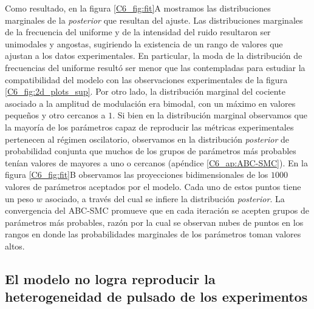 \documentclass[./main.tex]{subfiles}
\begin{document}
Como resultado, en la figura \ref{C6_fig:fit}A mostramos las distribuciones marginales de la \textit{posterior} que resultan del ajuste. Las distribuciones marginales de la frecuencia del uniforme y de la intensidad del ruido resultaron ser unimodales y angostas, sugiriendo la existencia de un rango de valores que ajustan a los datos experimentales. En particular, la moda de la distribución de frecuencias del uniforme resultó ser menor que las contempladas para estudiar la compatibilidad del modelo con las observaciones experimentales de la figura \ref{C6_fig:2d_plots_sup}. Por otro lado, la distribución marginal del cociente \dddelta asociado a la amplitud de modulación era bimodal, con un máximo en valores pequeños y otro cercanos a $1$. Si bien en la distribución marginal observamos que la mayoría de los parámetros capaz de reproducir las métricas experimentales pertenecen al régimen oscilatorio, observamos en la distribución \textit{posterior} de probabilidad conjunta que muchos de los grupos de parámetros más probables tenían valores de \dddelta mayores a uno o cercanos (apéndice \ref{C6_ap:ABC-SMC}). En la figura \ref{C6_fig:fit}B observamos las proyecciones bidimensionales de los $1000$ valores de parámetros aceptados por el modelo. Cada uno de estos puntos tiene un peso $w$ asociado, a través del cual se infiere la distribución \textit{posterior}. La convergencia del ABC-SMC promueve que en cada iteración se acepten grupos de parámetros más probables, razón por la cual se observan nubes de puntos en los rangos en donde las probabilidades marginales de los parámetros toman valores altos. 

\subsection{El modelo no logra reproducir la heterogeneidad de pulsado de los experimentos}
\label{C6_sssec:evaluac_params}
\end{document}

